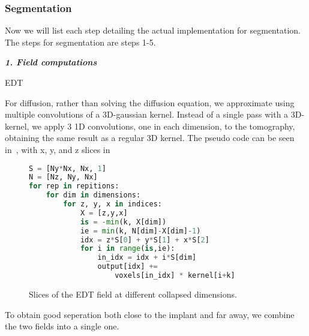 \subsubsection{Segmentation}
Now we will list each step detailing the actual implementation for segmentation. The steps for segmentation are steps 1-5.

\vspace{\baselineskip}
\noindent\textit{\textbf{1. Field computations}}

EDT

For diffusion, rather than solving the diffusion equation, we approximate using multiple convolutions of a 3D-gaussian kernel.
Instead of a single pass with a 3D-kernel, we apply 3 1D convolutions, one in each dimension, to the tomography, obtaining the same result as a regular 3D kernel.
The pseudo code can be seen in~, with x, y, and z slices in~

\begin{figure}
    \begin{lstlisting}[language=Python,caption=Python-like pseudo code for the diffusion approximation.,label=lis:diffusion]
S = [Ny*Nx, Nx, 1]
N = [Nz, Ny, Nx]
for rep in repitions:
    for dim in dimensions:
        for z, y, x in indices:
            X = [z,y,x]
            is = -min(k, X[dim])
            ie = min(k, N[dim]-X[dim]-1)
            idx = z*S[0] + y*S[1] + x*S[2]
            for i in range(is,ie):
                in_idx = idx + i*S[dim]
                output[idx] +=
                    voxels[in_idx] * kernel[i+k]
    \end{lstlisting}
\end{figure}

\begin{figure}
    \caption{Slices of the EDT field at different collapsed dimensions.}
    \label{fig:field-slices}
\end{figure}

To obtain good seperation both close to the implant and far away, we combine the two fields into a single one.


